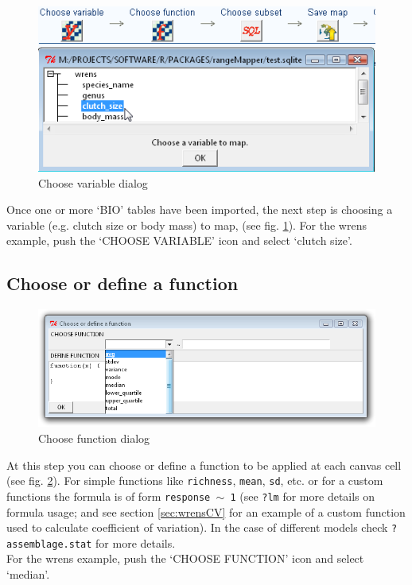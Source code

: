 \documentclass[ a4paper ]{article}
\begin{document}
	\begin{figure}[htbp]
	  \begin{center}
		\includegraphics[width=0.9\linewidth]{fig7}
		\caption{\label{fig:fig7}Choose variable dialog}
	  \end{center}
	\end{figure}

	Once one or more `BIO' tables have been imported, the next step is choosing a variable (e.g. clutch size or body mass) to map, (see fig. \ref{fig:fig7}). For the wrens example, push the `CHOOSE VARIABLE' icon and select `clutch size'.
	
	\subsection{ Choose or define a function}
	\begin{figure}[htbp]
	  \begin{center}
		\includegraphics[width=0.9\linewidth]{fig8}
		\caption{\label{fig:fig8} Choose function dialog}
	  \end{center}
	\end{figure}
At this step you can choose or define a function to be applied at each canvas cell (see fig. \ref{fig:fig8}). For simple functions like \texttt{richness}, \texttt{mean}, \texttt{sd}, etc. or for a custom functions the formula is of form \texttt{response $\sim$ 1} (see \texttt{?lm} for more details on formula usage; and see section \ref{sec:wrensCV} for an example of a custom function used to calculate coefficient of variation). In the case of different models check \texttt{?assemblage.stat} for more details. \\
For the wrens example, push the `CHOOSE FUNCTION' icon and select `median'.
	
\end{document}
